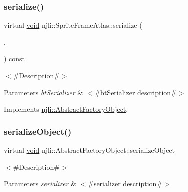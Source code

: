 \mbox{\label{classnjli_1_1_sprite_frame_atlas_a6eb5c74fba5bfbe51278d58eee374922}} 
\subsubsection{\texorpdfstring{serialize()}{serialize()}}
{\footnotesize\ttfamily virtual \mbox{\hyperlink{_thread_8h_af1e856da2e658414cb2456cb6f7ebc66}{void}} njli\+::\+Sprite\+Frame\+Atlas\+::serialize (\begin{DoxyParamCaption}\item[{\mbox{\hyperlink{_thread_8h_af1e856da2e658414cb2456cb6f7ebc66}{void}} $\ast$}]{,  }\item[{bt\+Serializer $\ast$}]{ }\end{DoxyParamCaption}) const\hspace{0.3cm}{\ttfamily [virtual]}}

$<$\#\+Description\#$>$


\begin{DoxyParams}{Parameters}
{\em bt\+Serializer} & $<$\#bt\+Serializer description\#$>$ \\
\hline
\end{DoxyParams}


Implements \mbox{\hyperlink{classnjli_1_1_abstract_factory_object_aad2fbe86fb3bdecf02918a96b9c57976}{njli\+::\+Abstract\+Factory\+Object}}.

\mbox{\label{classnjli_1_1_sprite_frame_atlas_a4fc4bcd9d1930911474210c047372fc0}} 
\subsubsection{\texorpdfstring{serialize\+Object()}{serializeObject()}}
{\footnotesize\ttfamily virtual \mbox{\hyperlink{_thread_8h_af1e856da2e658414cb2456cb6f7ebc66}{void}} njli\+::\+Abstract\+Factory\+Object\+::serialize\+Object}

$<$\#\+Description\#$>$


\begin{DoxyParams}{Parameters}
{\em serializer} & $<$\#serializer description\#$>$ \\
\hline
\end{DoxyParams}
\mbox{\label{classnjli_1_1_sprite_frame_atlas_a087eb5f8d9f51cc476f12f1d10a3cb95}} 
